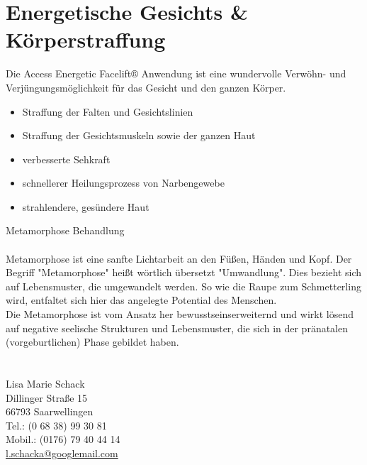 \documentclass[10pt,foldmark,notumble]{leaflet}
\begin{document}
\newpage
\vspace*{20mm}
\section{Energetische Gesichts \& Körperstraffung}
Die Access Energetic Facelift® Anwendung ist eine wundervolle Verwöhn- und Verjüngungsmöglichkeit für das Gesicht und den ganzen Körper.

\begin{itemize}
\item Straffung der Falten und Gesichtslinien
\item Straffung der Gesichtsmuskeln sowie der ganzen Haut
\item verbesserte Sehkraft
\item schnellerer Heilungsprozess von Narbengewebe
\item strahlendere, gesündere Haut
\end{itemize}

Metamorphose Behandlung\\
\\
Metamorphose ist eine sanfte Lichtarbeit an den Füßen, Händen und Kopf. Der Begriff "Metamorphose" heißt wörtlich übersetzt "Umwandlung". Dies bezieht sich auf Lebensmuster, die umgewandelt werden. So wie die Raupe zum Schmetterling wird, entfaltet sich hier das angelegte Potential des Menschen.
\\
Die Metamorphose ist vom Ansatz her bewusstseinserweiternd und wirkt lösend auf negative seelische Strukturen und Lebensmuster, die sich in der pränatalen (vorgeburtlichen) Phase gebildet haben.
\\


\vspace*{50mm}
\section{}%
Lisa Marie Schack\\
Dillinger Straße 15\\
66793 Saarwellingen\\
Tel.: (0 68 38) 99 30 81\\
Mobil.: (0176) 79 40 44 14\\
\href{mailto:l.schacka@googlemail.com}{l.schacka@googlemail.com} \\


\newpage
\vspace*{20mm}
\end{document}
